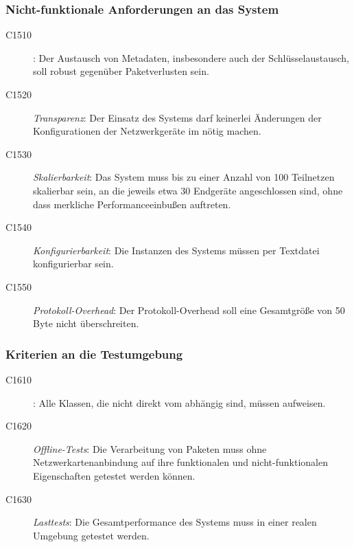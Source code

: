 \subsubsection{Nicht-funktionale Anforderungen an das System}
	\begin{description}
	
	  \item[C1510] \textit{}: Der Austausch von Metadaten, insbesondere auch der Schlüsselaustausch, soll robust gegenüber Paketverlusten sein.	
	  	  
	  \item[C1520] \textit{Transparenz}: Der Einsatz des Systems darf keinerlei Änderungen der Konfigurationen der Netzwerkgeräte im  nötig machen.
	
	  \item[C1530] \textit{Skalierbarkeit}: Das System muss bis zu einer Anzahl von 100 Teilnetzen skalierbar sein, an die jeweils etwa 30 Endgeräte angeschlossen sind, ohne dass merkliche Performanceeinbußen auftreten.
	  
	  \item[C1540] \textit{Konfigurierbarkeit}: Die Instanzen des Systems müssen per Textdatei konfigurierbar sein.
	  
	  \item[C1550] \textit{Protokoll-Overhead}: Der Protokoll-Overhead soll eine Gesamtgröße von 50 Byte nicht überschreiten.
	\end{description}


\subsubsection{Kriterien an die Testumgebung}
	\begin{description}
	  \item[C1610] \textit{}: Alle Klassen, die nicht direkt vom  abhängig sind, müssen  aufweisen.
	  
	  \item[C1620] \textit{Offline-Tests}: Die Verarbeitung von Paketen muss ohne Netzwerkartenanbindung auf ihre funktionalen und nicht-funktionalen Eigenschaften getestet werden können. 
	  
	  \item[C1630] \textit{Lasttests}: Die Gesamtperformance des Systems muss in einer realen Umgebung getestet werden.
	\end{description}


